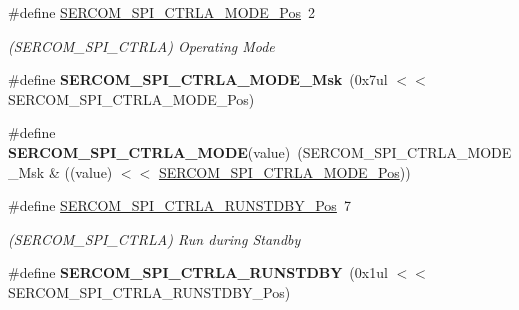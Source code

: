 \begin{DoxyCompactItemize}
\item 
\hypertarget{group___s_a_m_l21___s_e_r_c_o_m_ga52c079d744ef9c07762c97548eea6c8d}{}\#define \hyperlink{group___s_a_m_l21___s_e_r_c_o_m_ga52c079d744ef9c07762c97548eea6c8d}{S\+E\+R\+C\+O\+M\+\_\+\+S\+P\+I\+\_\+\+C\+T\+R\+L\+A\+\_\+\+M\+O\+D\+E\+\_\+\+Pos}~2\label{group___s_a_m_l21___s_e_r_c_o_m_ga52c079d744ef9c07762c97548eea6c8d}

\begin{DoxyCompactList}\small\item\em (S\+E\+R\+C\+O\+M\+\_\+\+S\+P\+I\+\_\+\+C\+T\+R\+L\+A) Operating Mode \end{DoxyCompactList}\item 
\hypertarget{group___s_a_m_l21___s_e_r_c_o_m_ga980f7f9c2bf7e9b43a87be4ba5a92dac}{}\#define {\bfseries S\+E\+R\+C\+O\+M\+\_\+\+S\+P\+I\+\_\+\+C\+T\+R\+L\+A\+\_\+\+M\+O\+D\+E\+\_\+\+Msk}~(0x7ul $<$$<$ S\+E\+R\+C\+O\+M\+\_\+\+S\+P\+I\+\_\+\+C\+T\+R\+L\+A\+\_\+\+M\+O\+D\+E\+\_\+\+Pos)\label{group___s_a_m_l21___s_e_r_c_o_m_ga980f7f9c2bf7e9b43a87be4ba5a92dac}

\item 
\hypertarget{group___s_a_m_l21___s_e_r_c_o_m_gad502c42221bf95cd69a4eca7a5c77148}{}\#define {\bfseries S\+E\+R\+C\+O\+M\+\_\+\+S\+P\+I\+\_\+\+C\+T\+R\+L\+A\+\_\+\+M\+O\+D\+E}(value)~(S\+E\+R\+C\+O\+M\+\_\+\+S\+P\+I\+\_\+\+C\+T\+R\+L\+A\+\_\+\+M\+O\+D\+E\+\_\+\+Msk \& ((value) $<$$<$ \hyperlink{group___s_a_m_l21___s_e_r_c_o_m_ga52c079d744ef9c07762c97548eea6c8d}{S\+E\+R\+C\+O\+M\+\_\+\+S\+P\+I\+\_\+\+C\+T\+R\+L\+A\+\_\+\+M\+O\+D\+E\+\_\+\+Pos}))\label{group___s_a_m_l21___s_e_r_c_o_m_gad502c42221bf95cd69a4eca7a5c77148}

\item 
\hypertarget{group___s_a_m_l21___s_e_r_c_o_m_ga7f2cfd4cf26f7728332a1133feb4d0b1}{}\#define \hyperlink{group___s_a_m_l21___s_e_r_c_o_m_ga7f2cfd4cf26f7728332a1133feb4d0b1}{S\+E\+R\+C\+O\+M\+\_\+\+S\+P\+I\+\_\+\+C\+T\+R\+L\+A\+\_\+\+R\+U\+N\+S\+T\+D\+B\+Y\+\_\+\+Pos}~7\label{group___s_a_m_l21___s_e_r_c_o_m_ga7f2cfd4cf26f7728332a1133feb4d0b1}

\begin{DoxyCompactList}\small\item\em (S\+E\+R\+C\+O\+M\+\_\+\+S\+P\+I\+\_\+\+C\+T\+R\+L\+A) Run during Standby \end{DoxyCompactList}\item 
\hypertarget{group___s_a_m_l21___s_e_r_c_o_m_ga3d66b0ce85e2a6d4f1ae4b88f191f60f}{}\#define {\bfseries S\+E\+R\+C\+O\+M\+\_\+\+S\+P\+I\+\_\+\+C\+T\+R\+L\+A\+\_\+\+R\+U\+N\+S\+T\+D\+B\+Y}~(0x1ul $<$$<$ S\+E\+R\+C\+O\+M\+\_\+\+S\+P\+I\+\_\+\+C\+T\+R\+L\+A\+\_\+\+R\+U\+N\+S\+T\+D\+B\+Y\+\_\+\+Pos)\label{group___s_a_m_l21___s_e_r_c_o_m_ga3d66b0ce85e2a6d4f1ae4b88f191f60f}


\end{DoxyCompactItemize}

